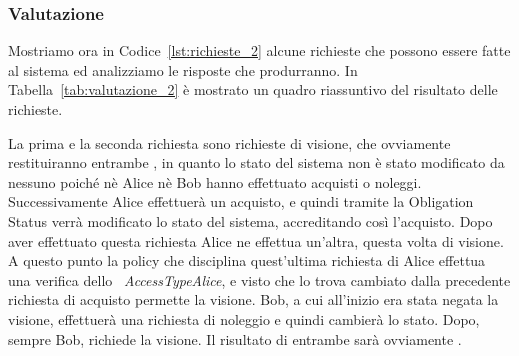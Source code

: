 \subsubsection{Valutazione}
Mostriamo ora in Codice~\ref{lst:richieste_2} alcune richieste che possono essere fatte al sistema ed analizziamo le risposte che produrranno. In Tabella~\ref{tab:valutazione_2} è mostrato un quadro riassuntivo del risultato delle richieste.

La prima e la seconda richiesta sono richieste di visione, che ovviamente restituiranno entrambe \deny, in quanto lo stato del sistema non è stato modificato da nessuno poiché nè Alice nè Bob hanno effettuato acquisti o noleggi.
Successivamente Alice effettuerà un acquisto, e quindi tramite la Obligation Status verrà modificato lo stato del sistema, accreditando così l'acquisto. Dopo aver effettuato questa richiesta Alice ne effettua un'altra, questa volta di visione. 
A questo punto la policy che disciplina quest'ultima richiesta di Alice effettua una verifica dello \statusattribute \ \textit{AccessTypeAlice}, e visto che lo trova cambiato dalla precedente richiesta di acquisto permette la visione.
Bob, a cui all'inizio era stata negata la visione, effettuerà una richiesta di noleggio e quindi cambierà lo stato. Dopo, sempre Bob, richiede la visione. Il risultato di entrambe sarà ovviamente \permit.

